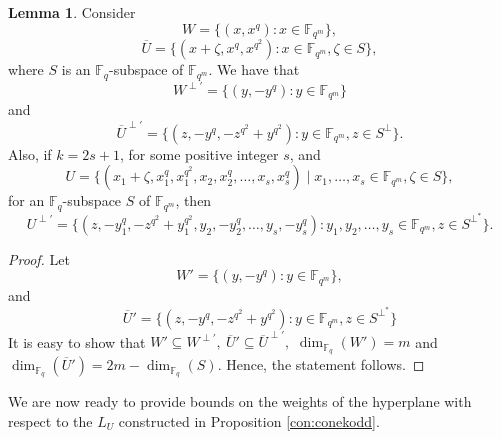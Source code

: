 \documentclass[11pt]{amsart}
\theoremstyle{definition}
\newtheorem{lemma}[theorem]{Lemma}
\newcommand{\fq}{{\mathbb F}_{q}}
\newcommand{\fqm}{\mathbb{F}_{q^m}}
\begin{document}
\begin{lemma}\label{lem:dual}
  Consider
    \[ W=\{(x,x^q)\colon x \in \fqm\}, \]
    \[ \overline{U}=\{(x+\zeta ,x^q,x^{q^2})\colon x \in \fqm, \zeta \in S\}, \]
    where $S$ is an $\fq$-subspace of $\fqm$.
    We have that
    \[ W^{\perp'}=\{ (y,-y^q) \colon y \in \fqm \} \]
    and 
    \[ \overline{U}^{\perp'}=\{ (z,-y^q,-z^{q^2}+y^{q^2}) \colon  y \in \fqm, z \in S^\perp \}. \]
    Also, if $k=2s+1$, for some positive integer $s$, and 
    $$U=\{(x_1+\zeta,x_1^q,x_1^{q^2}, x_2, x_2^{q}, \ldots, x_s,x_s^{q} )\mid x_1,\ldots,x_s\in \mathbb{F}_{q^m}, \zeta\in S\},$$
    for an $\fq$-subspace $S$ of $\fqm$, then
    \[U^{\perp'}=\{(z,-y_1^q,-z^{q^2}+y_1^{q^2},y_2,-y_2^q,\ldots,y_s,-y_s^q) \colon y_1,y_2,\ldots,y_s \in \fqm, z \in S^{\perp^*} \}.\]
\end{lemma}
\begin{proof}
    Let 
    \[W'=\{ (y,-y^q) \colon y \in \fqm \}, \]
    and 
    \[\overline{U}'=\{ (z,-y^q,-z^{q^2}+y^{q^2}) \colon y \in \fqm , z \in S^{\perp^*} \}\]
    It is easy to show that $W'\subseteq W^{\perp'}, \ \overline{U}'\subseteq \overline{U}^{\perp'},$ $\dim_{\fq}(W')=m$ and $\dim_{\fq}(\overline{U}')=2m-\dim_{\fq}(S)$.
    Hence, the statement follows.
\end{proof}

We are now ready to provide bounds on the weights of the hyperplane with respect to the $L_U$ constructed in Proposition \ref{con:conekodd}.
\end{document}
